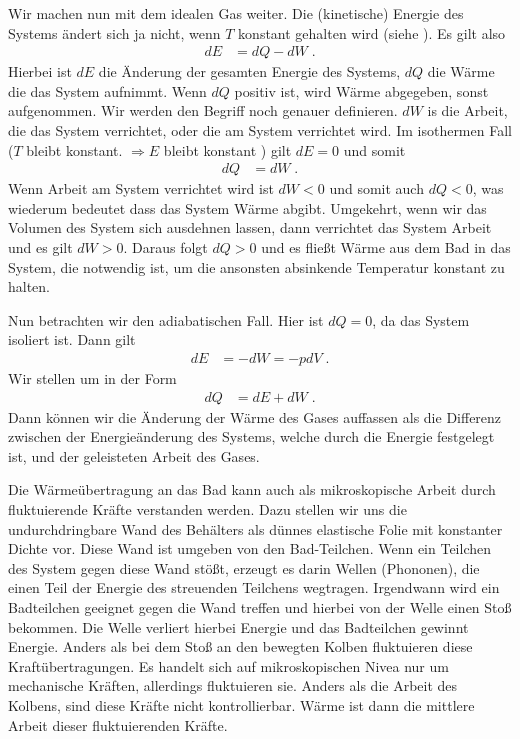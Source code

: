 Wir machen nun mit dem idealen Gas weiter.
Die (kinetische) Energie des Systems ändert sich ja nicht, wenn $T$ konstant gehalten wird (siehe ).
Es gilt also 
\begin{align}\label{eq:heat:EQW}
dE &= dQ - dW \;.
\end{align}
Hierbei ist $dE$ die Änderung der gesamten Energie des Systems, $dQ$  die Wärme die das System aufnimmt. Wenn $dQ$ positiv ist, wird Wärme abgegeben, sonst aufgenommen. Wir werden den Begriff noch genauer definieren. $dW$ is die Arbeit, die das System verrichtet, oder die am System verrichtet wird.  
Im isothermen Fall ($T$ bleibt konstant. $\Rightarrow E$ bleibt konstant ) gilt $dE=0$ und somit
\begin{align*}
dQ &= dW\;.
\end{align*}
Wenn Arbeit am  System verrichtet wird ist $dW<0$ und somit auch $dQ<0$, was wiederum bedeutet dass das System Wärme abgibt. Umgekehrt, wenn wir das Volumen des System sich ausdehnen lassen,
dann verrichtet das System Arbeit und es gilt 
$dW>0$. Daraus folgt $dQ>0$ und es fließt Wärme aus dem Bad in das System, die notwendig ist, um die ansonsten absinkende Temperatur konstant zu halten.

Nun betrachten wir den adiabatischen Fall. Hier ist $dQ=0$, da das System isoliert ist. Dann gilt
\begin{align*}
dE &= -dW = -pdV\;.
\end{align*}
Wir stellen  um in der Form
\begin{align*}
dQ &= dE + dW\;.
\end{align*}
Dann können wir die Änderung der {\color{blue}Wärme} des Gases auffassen als die Differenz zwischen der Energieänderung des Systems, welche durch die Energie festgelegt ist, und der geleisteten Arbeit des Gases.

Die Wärmeübertragung an das Bad kann auch als mikroskopische Arbeit durch fluktuierende Kräfte verstanden werden. Dazu stellen wir uns die undurchdringbare Wand des Behälters 
als dünnes elastische Folie mit konstanter Dichte vor. Diese Wand ist umgeben von den Bad-Teilchen. Wenn ein Teilchen des System gegen diese Wand stößt, erzeugt es darin Wellen (Phononen), die einen Teil der Energie des streuenden Teilchens wegtragen. Irgendwann wird ein Badteilchen geeignet gegen die Wand treffen und hierbei von der Welle einen Stoß bekommen. Die Welle verliert hierbei Energie  und das Badteilchen gewinnt Energie. Anders als bei dem Stoß an den bewegten Kolben fluktuieren diese Kraftübertragungen. Es handelt sich auf mikroskopischen Nivea nur um mechanische  Kräften, allerdings fluktuieren sie.
Anders als die Arbeit des Kolbens, sind diese Kräfte nicht kontrollierbar. Wärme ist dann die mittlere Arbeit dieser fluktuierenden Kräfte. 


